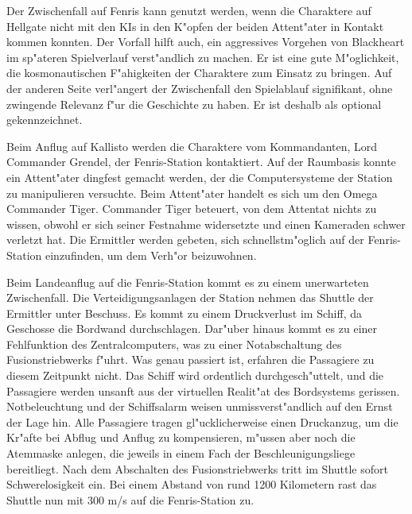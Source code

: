 
Der Zwischenfall auf Fenris kann genutzt werden, wenn die Charaktere auf Hellgate nicht mit den KIs in den K"opfen der beiden Attent"ater in Kontakt kommen konnten. Der Vorfall hilft auch, ein aggressives Vorgehen von Blackheart im sp"ateren Spielverlauf verst"andlich zu machen. Er ist eine gute M"oglichkeit, die kosmonautischen F"ahigkeiten der Charaktere zum Einsatz zu bringen. Auf der anderen Seite verl"angert der Zwischenfall den Spielablauf signifikant, ohne zwingende Relevanz f"ur die Geschichte zu haben. Er ist deshalb als optional gekennzeichnet.

Beim Anflug auf Kallisto werden die Charaktere vom Kommandanten, Lord Commander Grendel, der Fenris-Station kontaktiert. Auf der Raumbasis konnte ein Attent"ater dingfest gemacht werden, der die Computersysteme der Station zu manipulieren versuchte. Beim Attent"ater handelt es sich um den Omega Commander Tiger. Commander Tiger beteuert, von dem Attentat nichts zu wissen, obwohl er sich seiner Festnahme widersetzte und einen Kameraden schwer verletzt hat. Die Ermittler werden gebeten, sich schnellstm"oglich auf der Fenris-Station einzufinden, um dem Verh"or beizuwohnen.

Beim Landeanflug auf die Fenris-Station kommt es zu einem unerwarteten Zwischenfall. Die Verteidigungsanlagen der Station nehmen das Shuttle der Ermittler unter Beschuss. Es kommt zu einem Druckverlust im Schiff, da Geschosse die Bordwand durchschlagen. Dar"uber hinaus kommt es zu einer Fehlfunktion des Zentralcomputers, was zu einer Notabschaltung des Fusionstriebwerks f"uhrt. Was genau passiert ist, erfahren die Passagiere zu diesem Zeitpunkt nicht. Das Schiff wird ordentlich durchgesch"uttelt, und die Passagiere werden unsanft aus der virtuellen Realit"at des Bordsystems gerissen. Notbeleuchtung und der Schiffsalarm weisen unmissverst"andlich auf den Ernst der Lage hin. Alle Passagiere tragen gl"ucklicherweise einen Druckanzug, um die Kr"afte bei Abflug und Anflug zu kompensieren, m"ussen aber noch die Atemmaske anlegen, die jeweils in einem Fach der Beschleunigungsliege bereitliegt. Nach dem Abschalten des Fusionstriebwerks tritt im Shuttle sofort Schwerelosigkeit ein. Bei einem Abstand von rund 1200 Kilometern rast das Shuttle nun mit 300 m/s auf die Fenris-Station zu.

